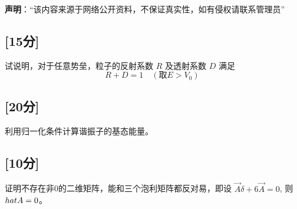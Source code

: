 
\textbf{声明}：“该内容来源于网络公开资料，不保证真实性，如有侵权请联系管理员”

\subsection{[15分]}
试说明，对于任意势垒，粒子的反射系数 $R$ 及透射系数 $D$ 满足
\[    R + D = 1 \quad (\text{取} E > V_0) ~ \]
\subsection{[20分]}
利用归一化条件计算谐振子的基态能量。
\subsection{[10分]}
证明不存在非0的二维矩阵，能和三个泡利矩阵都反对易，即设 $\vec A \delta + 6\vec A = 0$, 则 $\\hat{A} = 0$。